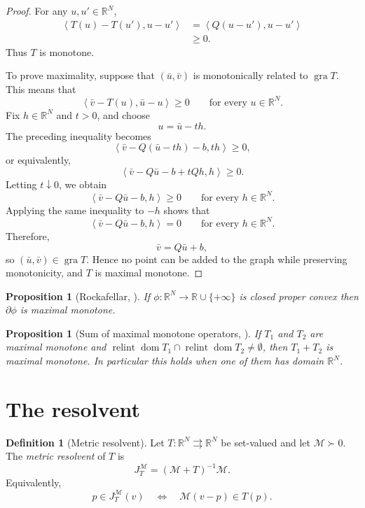 \documentclass[a4paper,11pt]{book}
\theoremstyle{plain}
\newtheorem{proposition}[theorem]{Proposition}
\theoremstyle{definition}
\newtheorem{definition}[theorem]{Definition}
\theoremstyle{remark}
\numberwithin{equation}{chapter}
\numberwithin{algorithm}{chapter}
\newcommand{\R}{\mathbb{R}}
\newcommand{\inner}[2]{\left\langle #1, #2 \right\rangle}
\newcommand{\dom}{\operatorname{dom}}
\newcommand{\relint}{\operatorname{relint}}
\begin{document}
	\begin{proof}
		For any \(u,u'\in\R^N\),
		\begin{align}
			\inner{T(u)-T(u')}{u-u'}
			&=
			\inner{Q(u-u')}{u-u'}\\
			&\geq0.
		\end{align}
		Thus \(T\) is monotone.
		
		To prove maximality, suppose that \((\bar u,\bar v)\) is monotonically
		related to \(\operatorname{gra}T\). This means that
		\[
		\inner{\bar v-T(u)}{\bar u-u}\geq0
		\qquad
		\text{for every }u\in\R^N.
		\]
		Fix \(h\in\R^N\) and \(t>0\), and choose
		\[
		u=\bar u-th.
		\]
		The preceding inequality becomes
		\[
		\inner{\bar v-Q(\bar u-th)-b}{th}\geq0,
		\]
		or equivalently,
		\[
		\inner{\bar v-Q\bar u-b+tQh}{h}\geq0.
		\]
		Letting \(t\downarrow0\), we obtain
		\[
		\inner{\bar v-Q\bar u-b}{h}\geq0
		\qquad
		\text{for every }h\in\R^N.
		\]
		Applying the same inequality to \(-h\) shows that
		\[
		\inner{\bar v-Q\bar u-b}{h}=0
		\qquad
		\text{for every }h\in\R^N.
		\]
		Therefore,
		\[
		\bar v=Q\bar u+b,
		\]
		so \((\bar u,\bar v)\in\operatorname{gra}T\). Hence no point can be added to
		the graph while preserving monotonicity, and \(T\) is maximal monotone.
	\end{proof}
	\begin{proposition}[Rockafellar, \cite{Rockafellar1970}]
		If $\phi:\R^N\to\R\cup\{+\infty\}$ is closed proper convex then
		$\partial\phi$ is maximal monotone.
	\end{proposition}
	
	\begin{proposition}[Sum of maximal monotone operators, \cite{Rockafellar1970}]
		If $T_1$ and $T_2$ are maximal monotone and
		$\relint\dom T_1\cap\relint\dom T_2\neq\emptyset$, then $T_1+T_2$ is maximal
		monotone. In particular this holds when one of them has domain $\R^N$.
	\end{proposition}
	\section{The resolvent}
	
	\begin{definition}[Metric resolvent]
		Let \(T:\R^N\rightrightarrows\R^N\) be set-valued and let
		\(\mathcal M\succ0\). The \emph{metric resolvent} of \(T\) is
		\begin{equation}
			J_T^{\mathcal M}
			=
			(\mathcal M+T)^{-1}\mathcal M.
		\end{equation}
		Equivalently,
		\begin{equation}
			p\in J_T^{\mathcal M}(v)
			\quad\Longleftrightarrow\quad
			\mathcal M(v-p)\in T(p).
		\end{equation}
	\end{definition}
	
\end{document}
